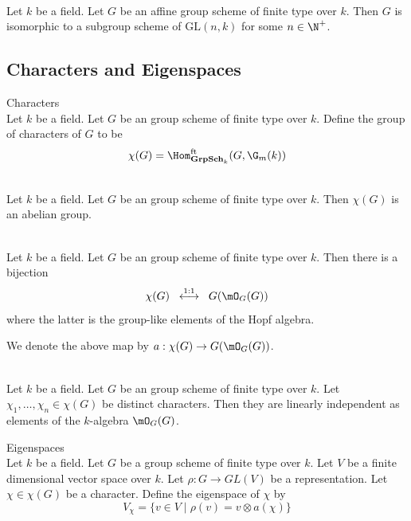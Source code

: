 \documentclass[a4paper]{article}
\begin{document}
\begin{crl}{}{}\\
Let $k$ be a field. Let $G$ be an affine group scheme of finite type over $k$. Then $G$ is isomorphic to a subgroup scheme of $\text{GL}(n,k)$ for some $n\in\N^+$. 
\end{crl}

\subsection{Characters and Eigenspaces}
\begin{defn}{Characters}{}\\
Let $k$ be a field. Let $G$ be an group scheme of finite type over $k$. Define the group of characters of $G$ to be $$\chi(G)=\Hom_{\bold{GrpSch}_k}^\text{ft}(G,\G_m(k))$$
\end{defn}

\begin{lmm}{}{}\\
Let $k$ be a field. Let $G$ be an group scheme of finite type over $k$. Then $\chi(G)$ is an abelian group. 
\end{lmm}

\begin{prp}{}{}\\
Let $k$ be a field. Let $G$ be an group scheme of finite type over $k$. Then there is a bijection $$\chi(G)\;\;\overset{1:1}{\longleftrightarrow}\;\;G(\mO_G(G))$$ where the latter is the group-like elements of the Hopf algebra. 
\end{prp}

We denote the above map by $a:\chi(G)\to G(\mO_G(G))$. 

\begin{prp}{}{}\\
Let $k$ be a field. Let $G$ be an group scheme of finite type over $k$. Let $\chi_1,\dots,\chi_n\in\chi(G)$ be distinct characters. Then they are linearly independent as elements of the $k$-algebra $\mO_G(G)$. 
\end{prp}

\begin{defn}{Eigenspaces}{}\\
Let $k$ be a field. Let $G$ be a group scheme of finite type over $k$. Let $V$ be a finite dimensional vector space over $k$. Let $\rho:G\to GL(V)$ be a representation. Let $\chi\in\chi(G)$ be a character. Define the eigenspace of $\chi$ by $$V_\chi=\{v\in V\;|\;\rho(v)=v\otimes a(\chi)\}$$
\end{defn}
\end{document}
